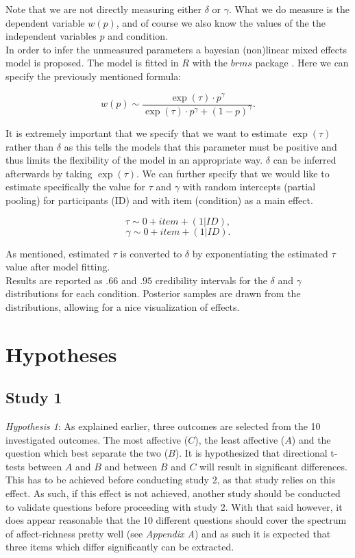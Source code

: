 \documentclass[12pt]{article}
\begin{document}
Note that we are not directly measuring either
$\delta$ or $\gamma$. What we do measure is the
dependent variable $w(p)$, and of course
we also know the values of the the independent
variables $p$ and condition. \\

In order to infer the
unmeasured parameters a bayesian (non)linear
mixed effects model is proposed. The model
is fitted in $R$ \autocite{rcore}
with the  $brms$ package \autocite{brms}.
Here we can specify the previously
mentioned formula:

 \[
	 w(p) \sim \frac{\exp({\tau})\cdot p^{\gamma}}
	 {\exp({\tau})\cdot p^{\gamma}+(1-p)^{\gamma}}
.\]

It is extremely important that we specify
that we want to estimate $\exp(\tau)$ rather
than  $\delta$ as this tells the models that
this parameter must be positive and thus
limits the flexibility of the model in an
appropriate way.  $\delta$ can be inferred
afterwards by taking  $\exp(\tau)$.
We can further specify that we would like to
estimate specifically the value for $\tau$
and $\gamma$ with random intercepts (partial pooling)
for participants (ID) and with item (condition)
as a main
effect.

 \[
	 \tau \sim 0 + item + (1|ID),
\]
\[
	\gamma \sim 0 + item + (1|ID)
.\]

As mentioned, estimated $\tau$ is converted
to $\delta$ by exponentiating the estimated
$\tau$ value after model fitting. \\

Results are reported as $.66$ and $.95$
credibility intervals
for the $\delta$ and $\gamma$ distributions
for each condition. Posterior samples
are drawn from the distributions, allowing
for a nice visualization of effects.

\section{Hypotheses}

\subsection{Study 1}
\emph{Hypothesis 1}: As explained earlier,
three outcomes are selected from the
10 investigated outcomes. The most
affective ($C$), the least affective ($A$) and the
question which best separate the two ($B$).
It is hypothesized that directional t-tests
between $A$ and  $B$ and between  $B$ and  $C$
will result in significant differences.
This has to be achieved before conducting
study 2, as that study relies on this effect.
As such, if this effect is not achieved, another
study should be conducted to validate questions
before proceeding with study 2. With that said
however, it does appear reasonable that
the 10 different questions should cover the
spectrum of affect-richness pretty well
(see \emph{Appendix A}) and as such it is
expected that three items which differ significantly
can be extracted.
\end{document}
